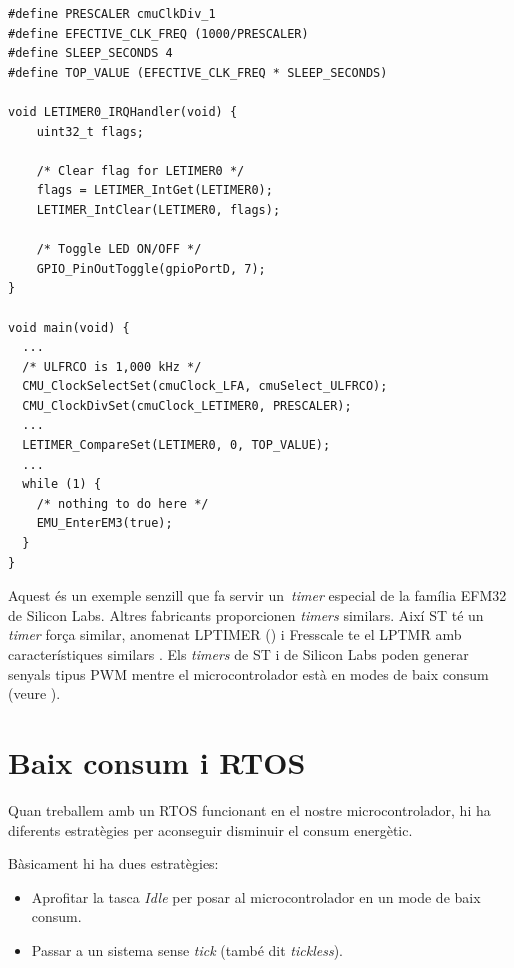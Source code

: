 \begin{lstlisting}[style=customc, caption={Exemple ús de {\bf LETIMER}}, label=LETIMER_example]
#define PRESCALER cmuClkDiv_1
#define EFECTIVE_CLK_FREQ (1000/PRESCALER)
#define SLEEP_SECONDS 4
#define TOP_VALUE (EFECTIVE_CLK_FREQ * SLEEP_SECONDS)

void LETIMER0_IRQHandler(void) {
	uint32_t flags;

	/* Clear flag for LETIMER0 */
	flags = LETIMER_IntGet(LETIMER0);
	LETIMER_IntClear(LETIMER0, flags);

	/* Toggle LED ON/OFF */
	GPIO_PinOutToggle(gpioPortD, 7);
}

void main(void) {
  ...
  /* ULFRCO is 1,000 kHz */
  CMU_ClockSelectSet(cmuClock_LFA, cmuSelect_ULFRCO);
  CMU_ClockDivSet(cmuClock_LETIMER0, PRESCALER);
  ...
  LETIMER_CompareSet(LETIMER0, 0, TOP_VALUE);
  ...
  while (1) {
    /* nothing to do here */
    EMU_EnterEM3(true);
  }
}
\end{lstlisting}

Aquest és un exemple senzill que fa servir un {\em timer} especial de la família EFM32 de Silicon Labs. Altres fabricants proporcionen {\em timers} similars. Així ST té un {\em timer} força similar, anomenat LPTIMER (\cite{ST_ANS4865}) i Fresscale te el LPTMR amb característiques similars \cite{Kinetis_LPTMR}. Els {\em timers} de ST i de Silicon Labs  poden generar senyals tipus \gls{PWM} mentre el microcontrolador està en modes de baix consum (veure ).

\section{Baix consum i RTOS}
\label{sec:lowpwerRTOS}
Quan treballem amb un RTOS funcionant en el nostre microcontrolador, hi ha diferents estratègies per aconseguir disminuir el consum energètic.

Bàsicament hi ha dues estratègies:
\begin{itemize}
 \item Aprofitar la tasca {\em Idle} per posar al microcontrolador en un mode de baix consum.
 \item Passar a un sistema sense {\em tick} (també dit {\em tickless}).
\end{itemize}

